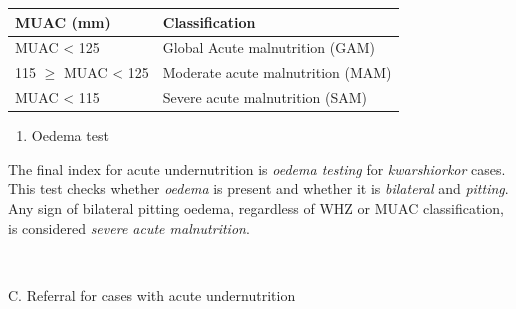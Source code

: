\documentclass[12pt,]{book}
\providecommand{\tightlist}{%
  \setlength{\itemsep}{0pt}\setlength{\parskip}{0pt}}
\theoremstyle{definition}
\theoremstyle{definition}
\theoremstyle{definition}
\theoremstyle{remark}
\begin{document}
\begin{longtable}[]{@{}ll@{}}
\toprule
\begin{minipage}[b]{0.34\columnwidth}\raggedright
\textbf{MUAC (mm)}\strut
\end{minipage} & \begin{minipage}[b]{0.47\columnwidth}\raggedright
\textbf{Classification}\strut
\end{minipage}\tabularnewline
\midrule
\endhead
\begin{minipage}[t]{0.34\columnwidth}\raggedright
MUAC \textless{} 125\strut
\end{minipage} & \begin{minipage}[t]{0.47\columnwidth}\raggedright
Global Acute malnutrition (GAM)\strut
\end{minipage}\tabularnewline
\begin{minipage}[t]{0.34\columnwidth}\raggedright
115 \(\geq\) MUAC \textless{} 125\strut
\end{minipage} & \begin{minipage}[t]{0.47\columnwidth}\raggedright
Moderate acute malnutrition (MAM)\strut
\end{minipage}\tabularnewline
\begin{minipage}[t]{0.34\columnwidth}\raggedright
MUAC \textless{} 115\strut
\end{minipage} & \begin{minipage}[t]{0.47\columnwidth}\raggedright
Severe acute malnutrition (SAM)\strut
\end{minipage}\tabularnewline
\bottomrule
\end{longtable}

\begin{enumerate}
\def\labelenumi{\arabic{enumi}.}
\setcounter{enumi}{2}
\tightlist
\item
  Oedema test
\end{enumerate}

The final index for acute undernutrition is \emph{oedema testing} for
\emph{kwarshiorkor} cases. This test checks whether \emph{oedema} is
present and whether it is \emph{bilateral} and \emph{pitting}. Any sign
of bilateral pitting oedema, regardless of WHZ or MUAC classification,
is considered \emph{severe acute malnutrition}.

~

C. Referral for cases with acute undernutrition
\end{document}
